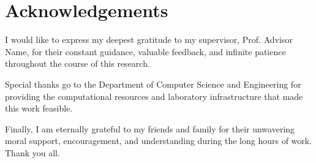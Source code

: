 \chapter*{Acknowledgements}
I would like to express my deepest gratitude to my supervisor, Prof. Advisor Name, for their constant guidance, valuable feedback, and infinite patience throughout the course of this research. 

Special thanks go to the Department of Computer Science and Engineering for providing the computational resources and laboratory infrastructure that made this work feasible.

Finally, I am eternally grateful to my friends and family for their unwavering moral support, encouragement, and understanding during the long hours of work. Thank you all.

